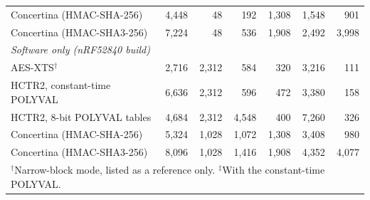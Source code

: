 \begin{table}[!hbt]
\begin{tabular}{lrrrrrr}
Concertina (HMAC-SHA-256)                            & 4{,}448 & 48 & 192 & 1{,}308 & 1{,}548 & 901 \\
Concertina (HMAC-SHA3-256)                           & 7{,}224 & 48 & 536 & 1{,}908 & 2{,}492 & 3{,}998 \\
\hline
\multicolumn{7}{l}{\emph{Software only (nRF52840 build)}} \\
AES-XTS$^\dagger$                                    & 2{,}716 & 2{,}312 & 584 & 320 & 3{,}216 & 111 \\
HCTR2, constant-time POLYVAL                         & 6{,}636 & 2{,}312 & 596 & 472 & 3{,}380 & 158 \\
HCTR2, 8-bit POLYVAL tables                          & 4{,}684 & 2{,}312 & 4{,}548 & 400 & 7{,}260 & 326 \\
Concertina (HMAC-SHA-256)                            & 5{,}324 & 1{,}028 & 1{,}072 & 1{,}308 & 3{,}408 & 980 \\
Concertina (HMAC-SHA3-256)                           & 8{,}096 & 1{,}028 & 1{,}416 & 1{,}908 & 4{,}352 & 4{,}077 \\
\hline
\multicolumn{7}{l}{\footnotesize $^\dagger$Narrow-block mode, listed as a reference only. $^\ddagger$With the constant-time POLYVAL.}
\end{tabular}
\end{table}

